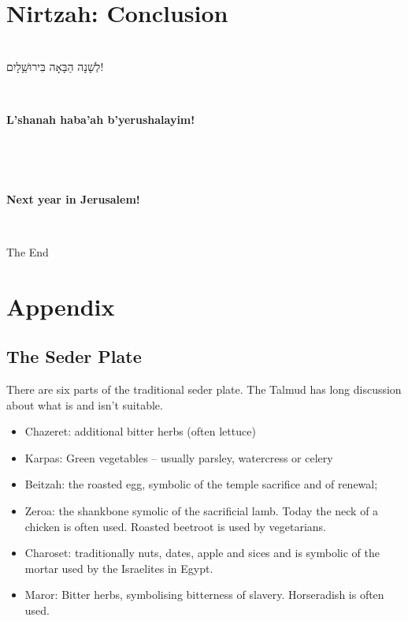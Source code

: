 \documentclass[a4paper,12pt,openany]{memoir}
\newcommand{\HgHL}[1]{{\large\textbf{#1}\par\noindent\\[-.5em]}}
\newenvironment{HgHebrew}{\begin{hebrew}\strut\\\noindent\Large}{\end{hebrew}}
\newenvironment{HgEnglish}{\strut\\\noindent}{\vspace{1em}}
\newenvironment{HgTranslit}{\strut\\\noindent\begin{itshape}}{\end{itshape}\vspace{1em}}
\begin{document}
\newpage
\chapter{Nirtzah: Conclusion}

\vfill

\begin{HgHebrew}
  לְשָׁנָה הַבָּאָה בִּירוּשַָׁלָיִם!
  \vspace{-1em}
\end{HgHebrew}

\begin{HgTranslit}
  \HgHL{L'shanah haba'ah b'yerushalayim!}
  \vspace{-3em}
\end{HgTranslit}

\begin{HgEnglish}
  \HgHL{Next year in Jerusalem!}
\end{HgEnglish}

\vfill
\begin{center}
  The End
\end{center}
\newpage

\appendix

\thispagestyle{empty}
\chapter{Appendix}
\vspace*{-1cm}
\section*{The Seder Plate}

There are six parts of the traditional seder plate. The Talmud has
long discussion about what is and isn't suitable.
\begin{itemize}
\item Chazeret: additional bitter herbs (often lettuce)
\item Karpas: Green vegetables -- usually parsley, watercress or
  celery
\item Beitzah: the roasted egg, symbolic of the temple sacrifice and
  of renewal;
\item Zeroa: the shankbone symolic of the sacrificial lamb. Today the
  neck of a chicken is often used. Roasted beetroot is used by vegetarians.
\item Charoset: traditionally nuts, dates, apple and sices and is symbolic of
  the mortar used by the Israelites in Egypt.
\item Maror: Bitter herbs, symbolising bitterness of
  slavery. Horseradish is often used.
\end{itemize}
\end{document}
